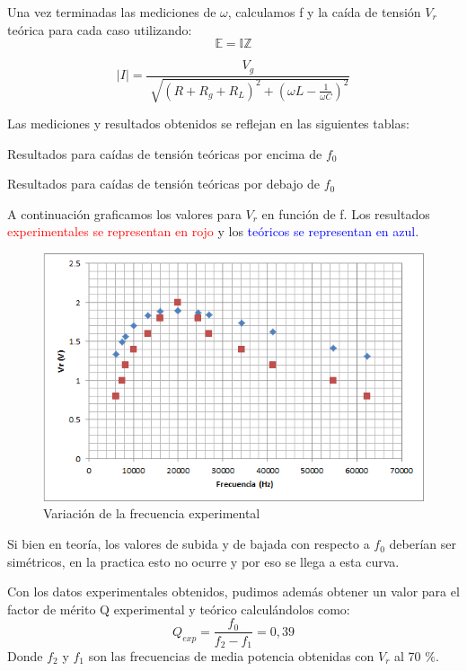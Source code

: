 \documentclass{article}
\begin{document}
Una vez terminadas las mediciones de $\omega$, calculamos f y la caída de tensión $V_r$ teórica para cada caso utilizando:
\begin{equation}
\mathds{E} = \mathds{IZ}
\end{equation}

\begin{equation}
\left |{I}\right |=\frac{V_g}{\sqrt[]{(R+R_g+R_L)^2+(\omega L -\frac{1}{\omega C } )^2}}
\end{equation}


Las mediciones y resultados obtenidos se reflejan en las siguientes tablas:
\begin{table}[H]
\centering

\caption{Resultados para caídas de tensión teóricas por encima de $f_0$}
\end{table}

\begin{table}[H]
\centering

\caption{Resultados para caídas de tensión teóricas por debajo de $f_0$}
\end{table}

A continuación graficamos los valores para $V_r$ en función de f. Los resultados \textcolor{red}{experimentales se representan en rojo} y los \textcolor{blue}{teóricos se representan en azul}.
\begin{figure}[H]
\centering
\includegraphics[scale=0.8]{curva}
\caption{Variación de la frecuencia experimental}
\end{figure}
Si bien en teoría, los valores de subida y de bajada con respecto a $f_{0}$ deberían ser simétricos, en la practica esto no ocurre y por eso se llega a esta curva.

Con los datos experimentales obtenidos, pudimos además obtener un valor para el factor de mérito Q experimental y teórico calculándolos como:
\begin{equation}
Q_{exp} = \frac{f_0}{f_2 - f_1} = 0,39
\end{equation}
Donde $f_{2}$ y $f_{1}$ son las frecuencias de media potencia obtenidas con $V_{r}$ al 70 $\%$.
\end{document}
